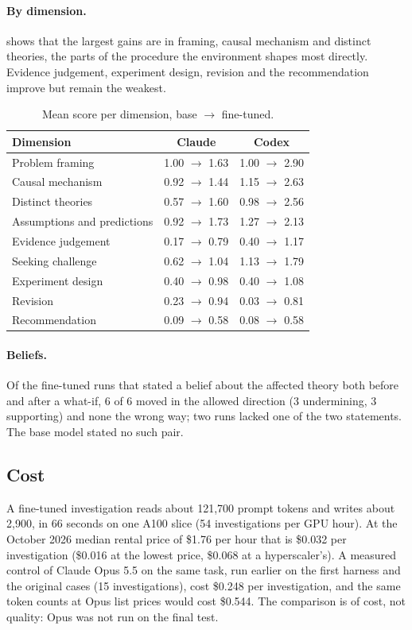 \paragraph{By dimension.}  shows that the largest gains are in framing, causal mechanism and distinct
theories, the parts of the procedure the environment shapes most directly. Evidence judgement, experiment design,
revision and the recommendation improve but remain the weakest.

\begin{table}[H]\centering\small
\caption{Mean score per dimension, base $\to$ fine-tuned.}\label{tab:dims}
\begin{tabular}{@{}lcc@{}}
\toprule
Dimension & Claude & Codex\\
\midrule
Problem framing & 1.00 $\to$ 1.63 & 1.00 $\to$ 2.90\\
Causal mechanism & 0.92 $\to$ 1.44 & 1.15 $\to$ 2.63\\
Distinct theories & 0.57 $\to$ 1.60 & 0.98 $\to$ 2.56\\
Assumptions and predictions & 0.92 $\to$ 1.73 & 1.27 $\to$ 2.13\\
Evidence judgement & 0.17 $\to$ 0.79 & 0.40 $\to$ 1.17\\
Seeking challenge & 0.62 $\to$ 1.04 & 1.13 $\to$ 1.79\\
Experiment design & 0.40 $\to$ 0.98 & 0.40 $\to$ 1.08\\
Revision & 0.23 $\to$ 0.94 & 0.03 $\to$ 0.81\\
Recommendation & 0.09 $\to$ 0.58 & 0.08 $\to$ 0.58\\
\bottomrule
\end{tabular}
\end{table}

\paragraph{Beliefs.} Of the fine-tuned runs that stated a belief about the affected theory both before and after a
what-if, 6 of 6 moved in the allowed direction (3 undermining, 3 supporting) and none the wrong way; two runs lacked one of
the two statements. The base model stated no such pair.

\subsection{Cost}
A fine-tuned investigation reads about 121{,}700 prompt tokens and writes about 2{,}900, in 66 seconds on one A100 slice
(54 investigations per GPU hour). At the October 2026 median rental price of \$1.76 per hour that is \$0.032 per
investigation (\$0.016 at the lowest price, \$0.068 at a hyperscaler's). A measured control of Claude Opus 5.5 on the same
task, run earlier on the first harness and the original cases (15 investigations), cost \$0.248 per investigation, and the same token counts at Opus list prices would cost \$0.544. The comparison is
of cost, not quality: Opus was not run on the final test.

